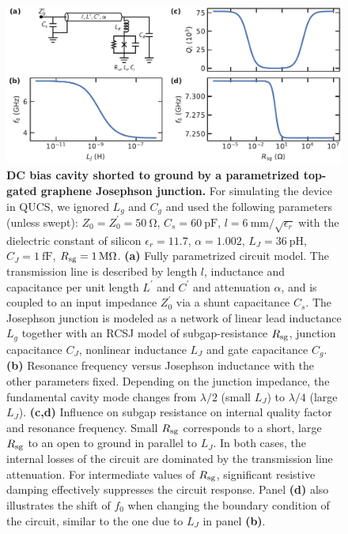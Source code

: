 \begin{figure}
	\centering
	\includegraphics[width=\linewidth]{chapter-introduction/figs/model_DC_bias_cavity_params_RCSJ.pdf}
	\caption{
		\textbf{DC bias cavity shorted to ground by a parametrized top-gated graphene Josephson junction.}
		For simulating the device in QUCS, we ignored $L_g$ and $C_g$ and used the following parameters (unless swept):
		$Z_0=Z_0^\prime=\SI{50}{\ohm}$, $C_s=\SI{60}{\pico\farad}$, $l=\SI{6}{\milli\meter}/\sqrt{\epsilon_r}$ with the dielectric constant of silicon $\epsilon_r=11.7$, $\alpha=1.002$,  $L_J=\SI{36}{\pico\henry}$, $C_J=\SI{1}{\femto\farad}$, $R_{\rm sg}=\SI{1}{\mega\ohm}$.
		\textbf{(a)} Fully parametrized circuit model.
		The transmission line is described by length $l$, inductance and capacitance per unit length $L^\prime$ and $C^\prime$ and attenuation $\alpha$, and is coupled to an input impedance $Z_0^\prime$ via a shunt capacitance $C_s$.
		The Josephson junction is modeled as a network of linear lead inductance $L_g$ together with an RCSJ model of subgap-resistance $R_{\rm sg}$, junction capacitance $C_J$, nonlinear inductance $L_J$ and gate capacitance $C_g$.
		\textbf{(b)} Resonance frequency versus Josephson inductance with the other parameters fixed.
		Depending on the junction impedance, the fundamental cavity mode changes from $\lambda/2$ (small $L_J$) to $\lambda/4$ (large $L_J$).
		\textbf{(c,d)} Influence on subgap resistance on internal quality factor and resonance frequency.
		Small $R_{\rm sg}$ corresponds to a short, large $R_{\rm sg}$ to an open to ground in parallel to $L_J$.
		In both cases, the internal losses of the circuit are dominated by the transmission line attenuation.
		For intermediate values of $R_{\rm sg}$, significant resistive damping effectively suppresses the circuit response.
		Panel \textbf{(d)} also illustrates the shift of $f_0$ when changing the boundary condition of the circuit, similar to the one due to $L_J$ in panel \textbf{(b)}.
	}
	\label{fig:TLmodel}
\end{figure}



